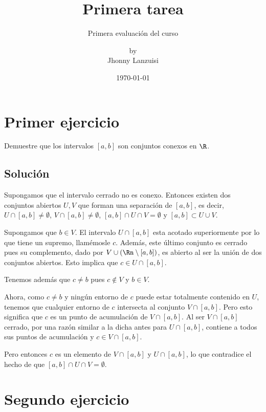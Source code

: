\documentclass{scrartcl}
\begin{document}
%
\title{Primera tarea}
\subtitle{Primera evaluación del curso}
\subject{Análisis III}
\titlehead{Universidad Simón Bolívar\hfill Caracas, Venezuela}
\author{by \\ Jhonny Lanzuisi}
\date{\today}
\maketitle

\section{Primer ejercicio}

Demuestre que los intervalos \([a,b]\) son conjuntos conexos
en \(\R\).

\subsection{Solución}

Supongamos que el intervalo cerrado no es conexo.
Entonces existen dos conjuntos abiertos \(U,V\) que forman
una separación de \([a,b]\), es decir, 
\(U\cap[a,b]\neq\emptyset\), \(V\cap[a,b]\neq\emptyset\),
\([a,b]\cap U\cap V = \emptyset\) y \([a,b]\subset U\cup V\).

Supongamos que \(b\in V\).
El intervalo \(U\cap[a,b]\) esta acotado superiormente
por lo que tiene un supremo, llamémosle \(c\).
Además, este último conjunto es cerrado pues
su complemento, dado por \(V\cup(\Rn\setminus[a,b])\),
es abierto al ser la unión de dos conjuntos abiertos.
Esto implica que \(c \in U\cap[a,b]\).

Tenemos además que \(c\neq b\) pues \(c\not\in V\) y
\(b\in V\).

Ahora, como \(c\neq b\) y ningún entorno de \(c\)
puede estar totalmente contenido en \(U\), tenemos
que cualquier entorno de \(c\) intersecta al conjunto \(V\cap[a,b]\).
Pero esto significa que \(c\) es un punto de acumulación 
de \(V\cap[a,b]\). Al ser \(V\cap[a,b]\) cerrado, por una razón
similar a la dicha antes para \(U\cap[a,b]\), contiene a todos
sus puntos de acumulación y \(c \in V\cap[a,b]\).

Pero entonces \(c\) es un elemento de \(V\cap[a,b]\) y \(U\cap[a,b]\),
lo que contradice el hecho de que \([a,b]\cap U\cap V = \emptyset\).
\section{Segundo ejercicio}
\end{document}
